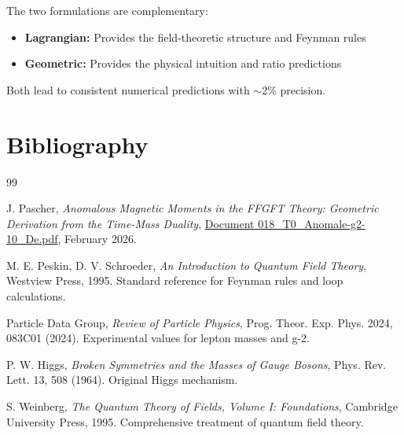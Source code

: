 	The two formulations are complementary:
	\begin{itemize}
		\item \textbf{Lagrangian:} Provides the field-theoretic structure and Feynman rules
		\item \textbf{Geometric:} Provides the physical intuition and ratio predictions
	\end{itemize}
	
	Both lead to consistent numerical predictions with $\sim$2\% precision.
	
	\section*{Bibliography}
	
	\begin{thebibliography}{99}
		
		J. Pascher,
		\textit{Anomalous Magnetic Moments in the FFGFT Theory: Geometric Derivation from the Time-Mass Duality},
		\href{https://github.com/jpascher/T0-Time-Mass-Duality/blob/main/2/pdf/018_T0_Anomale-g2-10_De.pdf}{Document 018\_T0\_Anomale-g2-10\_De.pdf},
		February 2026.
		
		M. E. Peskin, D. V. Schroeder,
		\textit{An Introduction to Quantum Field Theory},
		Westview Press, 1995.
		Standard reference for Feynman rules and loop calculations.
		
		Particle Data Group,
		\textit{Review of Particle Physics},
		Prog. Theor. Exp. Phys. 2024, 083C01 (2024).
		Experimental values for lepton masses and g-2.
		
		P. W. Higgs,
		\textit{Broken Symmetries and the Masses of Gauge Bosons},
		Phys. Rev. Lett. 13, 508 (1964).
		Original Higgs mechanism.
		
		S. Weinberg,
		\textit{The Quantum Theory of Fields, Volume I: Foundations},
		Cambridge University Press, 1995.
		Comprehensive treatment of quantum field theory.
		
	\end{thebibliography}
